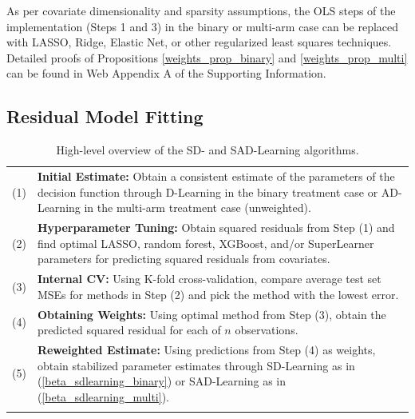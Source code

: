 \documentclass[useAMS,usenatbib]{biom}
\begin{document}
As per covariate dimensionality and sparsity assumptions, the OLS steps of the implementation (Steps 1 and 3) in the binary or multi-arm case can be replaced with LASSO, Ridge, Elastic Net, or other regularized least squares techniques. Detailed proofs of Propositions \ref{weights_prop_binary} and \ref{weights_prop_multi} can be found in Web Appendix A of the Supporting Information.

\subsection{Residual Model Fitting} \label{subsec_sdlearn_residual}

\begin{table} %
    \caption{High-level overview of the SD- and SAD-Learning algorithms.}
    \label{algorithm_table}
    \centering
    \begin{tabular}{p{0.25in}p{6.25in}}
    \hline \hline
        (1) & \textbf{Initial Estimate:} Obtain a consistent estimate of the parameters of the decision function through D-Learning in the binary treatment case or AD-Learning in the multi-arm treatment case (unweighted). \\
        (2) & \textbf{Hyperparameter Tuning:} Obtain squared residuals from Step (1) and find optimal LASSO, random forest, XGBoost, and/or SuperLearner parameters for predicting squared residuals from covariates. \\
        (3) & \textbf{Internal CV:} Using K-fold cross-validation, compare average test set MSEs for methods in Step (2) and pick the method with the lowest error. \\
        (4) & \textbf{Obtaining Weights:} Using optimal method from Step (3), obtain the predicted squared residual for each of $n$ observations. \\
        (5) & \textbf{Reweighted Estimate:} Using predictions from Step (4) as weights, obtain stabilized parameter estimates through SD-Learning as in (\ref{beta_sdlearning_binary}) or SAD-Learning as in (\ref{beta_sdlearning_multi}). \\
    \hline \hline \\
    \end{tabular}
\end{table}
\end{document}
